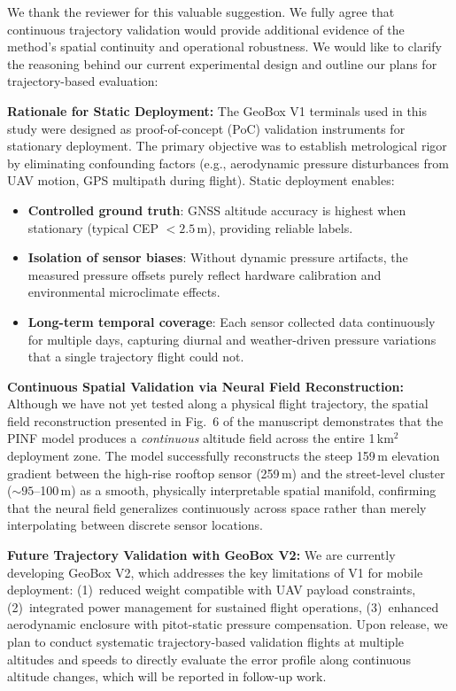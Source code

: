 We thank the reviewer for this valuable suggestion. We fully agree that continuous trajectory validation would provide additional evidence of the method's spatial continuity and operational robustness. We would like to clarify the reasoning behind our current experimental design and outline our plans for trajectory-based evaluation:

\textbf{Rationale for Static Deployment:}
The GeoBox V1 terminals used in this study were designed as proof-of-concept (PoC) validation instruments for stationary deployment. The primary objective was to establish metrological rigor by eliminating confounding factors (e.g., aerodynamic pressure disturbances from UAV motion, GPS multipath during flight). Static deployment enables:
\begin{itemize}
    \item \textbf{Controlled ground truth}: GNSS altitude accuracy is highest when stationary (typical CEP $< 2.5$\,m), providing reliable labels.
    \item \textbf{Isolation of sensor biases}: Without dynamic pressure artifacts, the measured pressure offsets purely reflect hardware calibration and environmental microclimate effects.
    \item \textbf{Long-term temporal coverage}: Each sensor collected data continuously for multiple days, capturing diurnal and weather-driven pressure variations that a single trajectory flight could not.
\end{itemize}

\textbf{Continuous Spatial Validation via Neural Field Reconstruction:}
Although we have not yet tested along a physical flight trajectory, the spatial field reconstruction presented in Fig.~6 of the manuscript demonstrates that the PINF model produces a \emph{continuous} altitude field across the entire 1\,km$^2$ deployment zone. The model successfully reconstructs the steep 159\,m elevation gradient between the high-rise rooftop sensor (259\,m) and the street-level cluster (${\sim}95$--100\,m) as a smooth, physically interpretable spatial manifold, confirming that the neural field generalizes continuously across space rather than merely interpolating between discrete sensor locations.

\textbf{Future Trajectory Validation with GeoBox V2:}
We are currently developing GeoBox V2, which addresses the key limitations of V1 for mobile deployment: (1)~reduced weight compatible with UAV payload constraints, (2)~integrated power management for sustained flight operations, (3)~enhanced aerodynamic enclosure with pitot-static pressure compensation. Upon release, we plan to conduct systematic trajectory-based validation flights at multiple altitudes and speeds to directly evaluate the error profile along continuous altitude changes, which will be reported in follow-up work.

